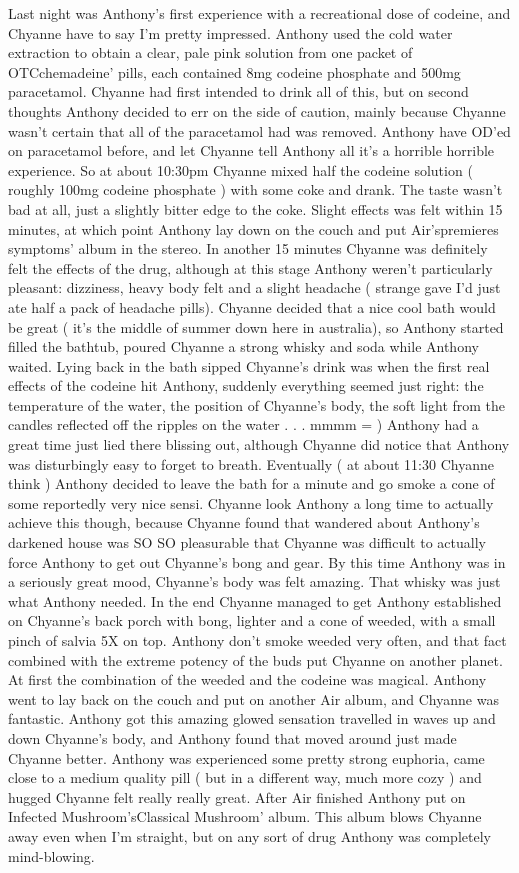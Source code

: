 \documentclass[12pt]{book}
\begin{document}
Last night was Anthony's first experience with a recreational dose of codeine, and Chyanne have to say I'm pretty impressed. Anthony used the cold water extraction to obtain a clear, pale pink solution from one packet of OTCchemadeine' pills, each contained 8mg codeine phosphate and 500mg paracetamol. Chyanne had first intended to drink all of this, but on second thoughts Anthony decided to err on the side of caution, mainly because Chyanne wasn't certain that all of the paracetamol had was removed. Anthony have OD'ed on paracetamol before, and let Chyanne tell Anthony all it's a horrible horrible experience. So at about 10:30pm Chyanne mixed half the codeine solution ( roughly 100mg codeine phosphate ) with some coke and drank. The taste wasn't bad at all, just a slightly bitter edge to the coke. Slight effects was felt within 15 minutes, at which point Anthony lay down on the couch and put Air'spremieres symptoms' album in the stereo. In another 15 minutes Chyanne was definitely felt the effects of the drug, although at this stage Anthony weren't particularly pleasant: dizziness, heavy body felt and a slight headache ( strange gave I'd just ate half a pack of headache pills). Chyanne decided that a nice cool bath would be great ( it's the middle of summer down here in australia), so Anthony started filled the bathtub, poured Chyanne a strong whisky and soda while Anthony waited. Lying back in the bath sipped Chyanne's drink was when the first real effects of the codeine hit Anthony, suddenly everything seemed just right: the temperature of the water, the position of Chyanne's body, the soft light from the candles reflected off the ripples on the water . . . mmmm = ) Anthony had a great time just lied there blissing out, although Chyanne did notice that Anthony was disturbingly easy to forget to breath. Eventually ( at about 11:30 Chyanne think ) Anthony decided to leave the bath for a minute and go smoke a cone of some reportedly very nice sensi. Chyanne look Anthony a long time to actually achieve this though, because Chyanne found that wandered about Anthony's darkened house was SO SO pleasurable that Chyanne was difficult to actually force Anthony to get out Chyanne's bong and gear. By this time Anthony was in a seriously great mood, Chyanne's body was felt amazing. That whisky was just what Anthony needed. In the end Chyanne managed to get Anthony established on Chyanne's back porch with bong, lighter and a cone of weeded, with a small pinch of salvia 5X on top. Anthony don't smoke weeded very often, and that fact combined with the extreme potency of the buds put Chyanne on another planet. At first the combination of the weeded and the codeine was magical. Anthony went to lay back on the couch and put on another Air album, and Chyanne was fantastic. Anthony got this amazing glowed sensation travelled in waves up and down Chyanne's body, and Anthony found that moved around just made Chyanne better. Anthony was experienced some pretty strong euphoria, came close to a medium quality pill ( but in a different way, much more cozy ) and hugged Chyanne felt really really great. After Air finished Anthony put on Infected Mushroom'sClassical Mushroom' album. This album blows Chyanne away even when I'm straight, but on any sort of drug Anthony was completely mind-blowing. 
\end{document}

